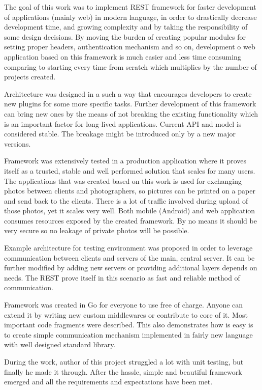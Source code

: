 The goal of this work was to implement REST framework for faster development of
applications (mainly web) in modern language, in order to drastically decrease
development time, and growing complexity and by taking the responsibility of
some design decisions. By moving the burden of creating popular modules for
setting proper headers, authentication mechanism and so on, development o web
application based on this framework is much easier and less time consuming
comparing to starting every time from scratch which multiplies by the number of
projects created.

Architecture was designed in a such a way that encourages developers to create
new plugins for some more specific tasks. Further development of this framework
can bring new ones by the means of not breaking the existing functionality
which is an important factor for long-lived applications. Current API and model
is considered stable. The breakage might be introduced only by a new major
versions.

Framework was extensively tested in a production application where it proves
itself as a trusted, stable and well performed solution that scales for many
users. The applications that was created based on this work is used for
exchanging photos between clients and photographers, so pictures can be printed
on a paper and send back to the clients. There is a lot of traffic involved
during upload of those photos, yet it scales very well. Both mobile (Android)
and web application consumes resources exposed by the created framework. By no
means it should be very secure so no leakage of private photos will be
possible.

Example architecture for testing environment was proposed in order to leverage
communication between clients and servers of the main, central server. It can
be further modified by adding new servers or providing additional layers
depends on needs. The REST prove itself in this scenario as fast and reliable
method of communication.

Framework was created in Go for everyone to use free of charge. Anyone can
extend it by writing new custom middlewares or contribute to core of it. Most
important code fragments were described. This also demonstrates how is easy is
to create simple communication mechanism implemented in fairly new language
with well designed standard library.

During the work, author of this project struggled a lot with unit testing, but
finally he made it through. After the hassle, simple and beautiful framework
emerged and all the requirements and expectations have been met.
